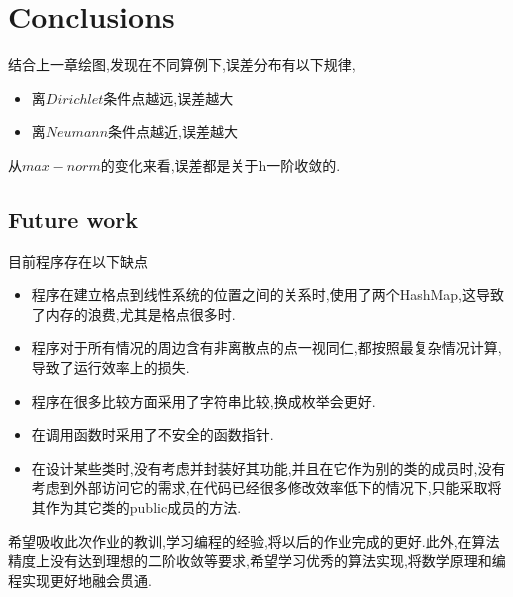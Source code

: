 \chapter{Conclusions}
\label{ch:conclusions}

结合上一章绘图,发现在不同算例下,误差分布有以下规律,

\begin{itemize}
    \item 离$Dirichlet$条件点越远,误差越大
    \item 离$Neumann$条件点越近,误差越大
\end{itemize}

从$max-norm$的变化来看,误差都是关于h一阶收敛的.


\section{Future work}

目前程序存在以下缺点
\begin{itemize}
    \item 程序在建立格点到线性系统的位置之间的关系时,使用了两个HashMap,这导致了内存的浪费,尤其是格点很多时.
    \item 程序对于所有情况的周边含有非离散点的点一视同仁,都按照最复杂情况计算,导致了运行效率上的损失.
    \item 程序在很多比较方面采用了字符串比较,换成枚举会更好.
    \item 在调用函数时采用了不安全的函数指针.
    \item 在设计某些类时,没有考虑并封装好其功能,并且在它作为别的类的成员时,没有考虑到外部访问它的需求,在代码已经很多修改效率低下的情况下,只能采取将其作为其它类的public成员的方法.
\end{itemize}

希望吸收此次作业的教训,学习编程的经验,将以后的作业完成的更好.此外,在算法精度上没有达到理想的二阶收敛等要求,希望学习优秀的算法实现,将数学原理和编程实现更好地融会贯通.

